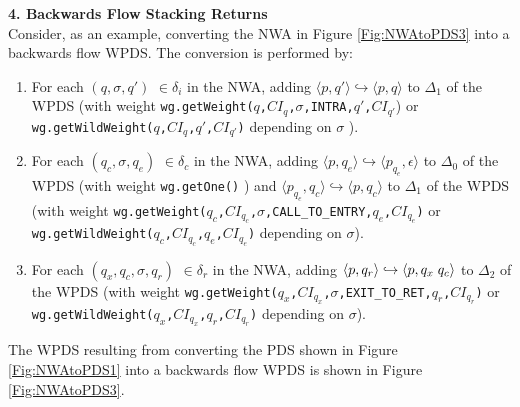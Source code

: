 \documentclass{llncs}
\begin{document}
\noindent \textbf{4. Backwards Flow Stacking Returns} \\

\noindent Consider, as an example, converting the NWA in Figure \ref{Fig:NWAtoPDS3} into a backwards flow WPDS.  The conversion is performed by:

\begin{enumerate}

\item For each $(q,\sigma,q')$ $\in \delta_i$ in the NWA, adding $\langle p,q' \rangle \hookrightarrow \langle p,q \rangle$ to $\Delta_1$ of the WPDS (with weight \texttt{wg.getWeight($q$,$CI_q$,$\sigma$,INTRA,$q'$,$CI_{q'}$}) or \texttt{wg.getWildWeight($q$,$CI_q$,$q'$,$CI_{q'}$)} depending on $\sigma$ ).

\item For each $(q_c,\sigma, q_e)$ $\in \delta_c$ in the NWA, adding $\langle p,q_e \rangle \hookrightarrow \langle p_{q_e},\epsilon \rangle$ to $\Delta_0$ of the WPDS (with weight \texttt{wg.getOne()} ) and $\langle p_{q_e},q_c \rangle \hookrightarrow \langle p,q_c \rangle$ to $\Delta_1$ of the WPDS (with weight \texttt{wg.getWeight($q_c$,$CI_{q_c}$,$\sigma$,CALL\_TO\_ENTRY,$q_e$,$CI_{q_e}$)} or \texttt{wg.getWildWeight($q_c$,$CI_{q_c}$,$q_e$,$CI_{q_e}$)} depending on $\sigma$).

\item For each $(q_x,q_c,\sigma,q_r)$ $\in \delta_r$ in the NWA, adding $\langle p,q_r \rangle \hookrightarrow \langle p,q_x \hspace{.1cm} q_c \rangle$ to $\Delta_2$ of the WPDS (with weight \texttt{wg.getWeight($q_x$,$CI_{q_x}$,$\sigma$,EXIT\_TO\_RET,$q_r$,$CI_{q_r}$)} or \texttt{wg.getWildWeight($q_x$,$CI_{q_x}$,$q_r$,$CI_{q_r}$)} depending on $\sigma$).
\end{enumerate}

\noindent The WPDS resulting from converting the PDS shown in Figure \ref{Fig:NWAtoPDS1} into a backwards flow WPDS is shown in Figure \ref{Fig:NWAtoPDS3}. \\
\end{document}
